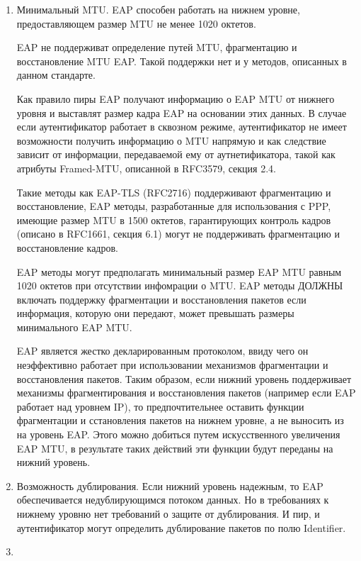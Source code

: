 \begin{enumerate}
 \item Минимальный MTU. EAP способен работать на нижнем уровне, предоставляющем размер MTU не менее 1020 октетов.

EAP не поддерживат определение путей MTU, фрагментацию и восстановление MTU EAP. Такой поддержки нет и у методов, описанных в данном стандарте.

Как правило пиры EAP получают информацию о EAP MTU от нижнего уровня и выставлят размер кадра EAP на основании этих данных. В случае если аутентификатор работает в сквозном режиме, аутентификатор не имеет возможности получить информацию о MTU напрямую и как следствие зависит от информации, передаваемой ему от аутнетификатора, такой как атрибуты Framed-MTU, описанной в RFC3579, секция 2.4.

Такие методы как EAP-TLS (RFC2716) поддерживают фрагментацию и восстановление, EAP методы, разработанные для использования с PPP, имеющие размер MTU в 1500 октетов, гарантирующих контроль кадров (описано в RFC1661, секция 6.1) могут не поддерживать фрагментацию и восстановление кадров.

EAP методы могут предполагать минимальный размер EAP MTU равным 1020 октетов при отсутствии инфомрации о MTU. EAP методы ДОЛЖНЫ включать поддержку фрагментации и восстановления пакетов если информация, которую они передают, может превышать размеры минимального EAP MTU.

EAP является жестко декларированным протоколом, ввиду чего он неэффективно работает при использовании механизмов фрагментации и восстановления пакетов. Таким образом, если нижний уровень поддерживает механизмы фрагментирования и восстановления пакетов (например если EAP работает над уровнем IP), то предпочтительнее оставить функции фрагментации и сстановления пакетов на нижнем уровне, а не выносить из на уровень EAP. Этого можно добиться путем искусственного увеличения EAP MTU, в результате таких действий эти функции будут переданы на нижний уровень.

\item Возможность дублирования. Если нижний уровень надежным, то EAP обеспечивается недублирующимся потоком данных. Но в требованиях к нижнему уровню нет требований о защите от дублирования. И пир, и аутентификатор могут определить дублирование пакетов по полю Identifier.

\item 

\end{enumerate}
